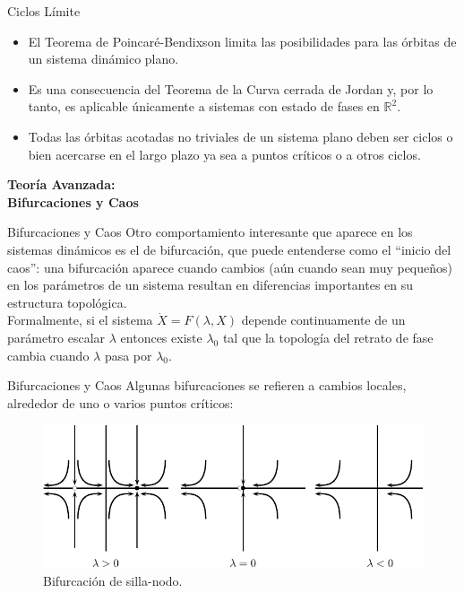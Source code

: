 \documentclass{beamer}
\newcommand{\R}{{\ensuremath{\mathbb{R}}}}
\newcommand{\stframe}[1]{\begin{frame} \begin{center}\Large{\textbf{{#1}}}\end{center}\end{frame}}
\begin{document}
\begin{frame}{Ciclos Límite}
\begin{itemize}
	\item El Teorema de Poincaré-Bendixson limita las posibilidades para las órbitas de un sistema dinámico plano.
	\item Es una consecuencia del Teorema de la Curva cerrada de Jordan y, por lo tanto, es aplicable únicamente a sistemas con estado de fases en $\R^2$.
	\item Todas las órbitas acotadas no triviales de un sistema plano deben ser ciclos o bien acercarse en el largo plazo ya sea a puntos críticos o a otros ciclos.
\end{itemize}

\end{frame}

\stframe{Teoría Avanzada:\\Bifurcaciones y Caos}
\begin{frame}{Bifurcaciones y Caos}
Otro comportamiento interesante que aparece en los sistemas dinámicos es el de bifurcación, que puede entenderse como el ``inicio del caos'': una bifurcación aparece cuando cambios (aún cuando sean muy pequeños) en los parámetros de un sistema resultan en diferencias importantes en su estructura topológica.\\ \pause
Formalmente, si el sistema $\dot{X} = F(\lambda, X)$ depende continuamente de un parámetro escalar $\lambda$ entonces existe $\lambda_0$ tal que la topología del retrato de fase cambia cuando $\lambda$ pasa por $\lambda_0$.
\end{frame}

\begin{frame}{Bifurcaciones y Caos}
Algunas bifurcaciones se refieren a cambios locales, alrededor de uno o varios puntos críticos:

\begin{figure} \centering
    \includegraphics[scale=0.9]{../figures/bifurcations-saddlenode.pdf}
    \caption{Bifurcación de silla-nodo.}	
\end{figure}
\end{frame}
\end{document}
